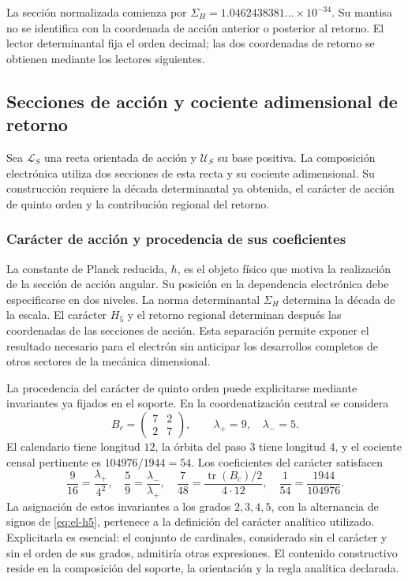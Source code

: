 La sección normalizada comienza por
\(\Sigma_H=1.0462438381\ldots\times10^{-34}\). Su mantisa no se
identifica con la coordenada de acción anterior o posterior al retorno.
El lector determinantal fija el orden decimal; las dos coordenadas de
retorno se obtienen mediante los lectores siguientes.


\subsection{Secciones de acción y cociente adimensional de retorno}

Sea \(\mathcal L_S\) una recta orientada de acción y \(\mathcal U_S\)
su base positiva. La composición electrónica utiliza dos secciones de
esta recta y su cociente adimensional. Su construcción requiere la
década determinantal ya obtenida, el carácter de acción de quinto orden
y la contribución regional del retorno.

\subsubsection{Carácter de acción y procedencia de sus coeficientes}
\label{sec:revision-planck}

La constante de Planck reducida, \(\hbar\), es el objeto físico que
motiva la realización de la sección de acción angular. Su posición en
la dependencia electrónica debe especificarse en dos niveles. La norma
determinantal \(\Sigma_H\) determina la década de la escala. El carácter
\(H_5\) y el retorno regional determinan después las coordenadas de las
secciones de acción. Esta separación permite exponer el resultado
necesario para el electrón sin anticipar los desarrollos completos de
otros sectores de la mecánica dimensional.

La procedencia del carácter de quinto orden puede explicitarse mediante
invariantes ya fijados en el soporte. En la coordenatización central se considera
\[
 B_c=\begin{pmatrix}7&2\\2&7\end{pmatrix},
 \qquad \lambda_+=9,\quad\lambda_-=5.
\]
El calendario tiene longitud \(12\), la órbita del paso \(3\) tiene
longitud \(4\), y el cociente censal pertinente es
\(104976/1944=54\). Los coeficientes del carácter satisfacen
\begin{equation}
 \frac9{16}=\frac{\lambda_+}{4^2},\quad
 \frac59=\frac{\lambda_-}{\lambda_+},\quad
 \frac7{48}=\frac{\operatorname{tr}(B_c)/2}{4\cdot12},\quad
 \frac1{54}=\frac{1944}{104976}.
 \label{eq:revision-h5-coeficientes}
\end{equation}
La asignación de estos invariantes a los grados \(2,3,4,5\), con la
alternancia de signos de \eqref{eq:el-h5}, pertenece a la definición del
carácter analítico utilizado. Explicitarla es esencial: el conjunto de
cardinales, considerado sin el carácter y sin el orden de sus grados,
admitiría otras expresiones. El contenido constructivo reside en la
composición del soporte, la orientación y la regla analítica declarada.

